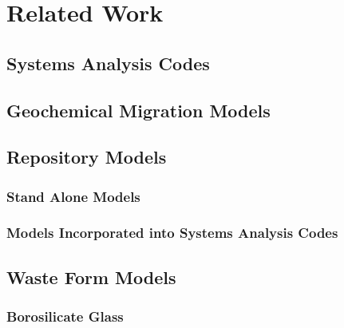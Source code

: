 \chapter{Related Work}
\section{Systems Analysis Codes}
\section{Geochemical Migration Models}
\section{Repository Models}
\subsection{Stand Alone Models}
\subsection{Models Incorporated into Systems Analysis Codes}
\section{Waste Form Models}
\subsection{Borosilicate Glass}
